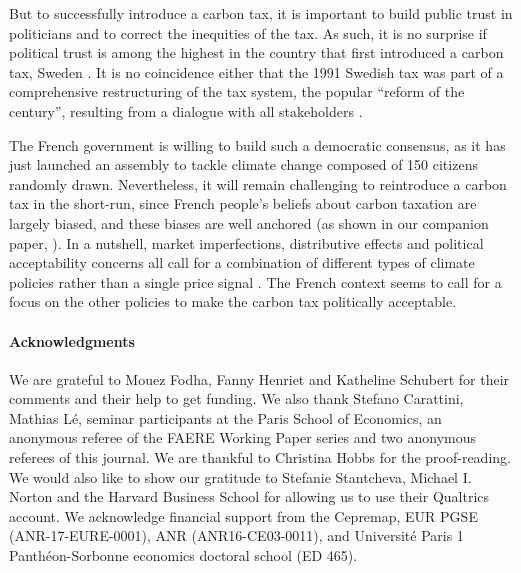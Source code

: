 \documentclass[english,5p,authoryear]{elsarticle}
\begin{document}
But to successfully introduce a carbon tax, it is important to build public trust in politicians \citep{harring_jagers_2013,rafaty_perceptions_2018} and to correct the inequities of the tax. As such, it is no surprise if political trust is among the highest in the country that first introduced a carbon tax, Sweden \citep{klenert_making_2018}. It is no coincidence either that the 1991 Swedish tax was part of a comprehensive restructuring of the tax system, the popular ``reform of the century'', resulting from a dialogue with all stakeholders \citep{sterner_environmental_2014}. 

The French government is willing to build such a democratic consensus, as it has just launched an assembly to tackle climate change composed of 150 citizens randomly drawn. Nevertheless, it will remain challenging to reintroduce a carbon tax in the short-run, since French people's beliefs about carbon taxation are largely biased, and these biases are well anchored (as shown in our companion paper, \citealt{douenne_can_2019}). In a nutshell, market imperfections, distributive effects and political acceptability concerns all call for a combination of different types of climate policies rather than a single price signal \citep{stern_report_2017,stiglitz_addressing_2019}. The French context seems to call for a focus on the other policies to make the carbon tax politically acceptable. %

%

%

%

%

%

%

%
%

%

%


\paragraph*{Acknowledgments} We are grateful to Mouez Fodha, Fanny Henriet and Katheline Schubert for their comments and their help to get funding. We also thank Stefano Carattini, Mathias Lé, seminar participants at the Paris School of Economics, an anonymous referee of the FAERE Working Paper series and two anonymous referees of this journal. We are thankful to Christina Hobbs for the proof-reading. We would also like to show our gratitude to Stefanie Stantcheva, Michael I. Norton and the Harvard Business School for allowing us to use their Qualtrics account. We acknowledge financial support from the Cepremap, EUR PGSE (ANR-17-EURE-0001), ANR (ANR16-CE03-0011), and Université Paris 1 Panthéon-Sorbonne economics doctoral school (ED 465).
\end{document}
